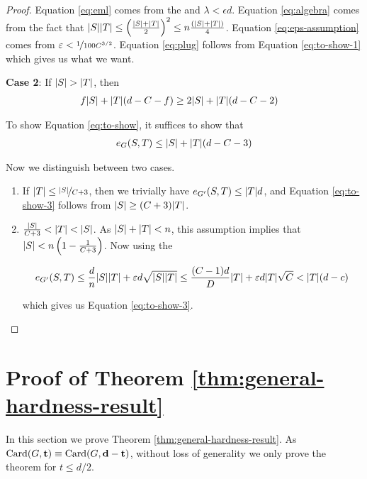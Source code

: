 \documentclass[11pt]{article}
\begin{document}
\begin{proof}
Equation \eqref{eq:eml} comes from the  and $\lambda < \epsilon d$.
Equation \eqref{eq:algebra} comes from the fact that $\Size{S}\Size{T} \leq \left(\frac{\Size{S}+\Size{T}}{2}\right)^2 \le n\frac{(\Size{S}+\Size{T})}{4}$.
Equation \eqref{eq:eps-assumption} comes from $\epsilon < \nicefrac{1}{100C^{3/2}}$.
Equation \eqref{eq:plug} follows from Equation \eqref{eq:to-show-1} which gives us what we want.

\textbf{Case 2}: If $\Size{S} > \Size{T}$, then 
  \begin{align}
    f\Size{S} +  \Size{T}(d-C-f)  &\ge 2\Size{S} +\Size{T}(d-C-2) \label{eq:to-show-2}
  \end{align}
  
  To show Equation \eqref{eq:to-show}, it suffices to show that
\begin{align}
  \CutEdges{S}{T}{G} \leq \Size{S} + \Size{T}(d-C-3) \label{eq:to-show-3}
\end{align}

Now we distinguish between two cases.

\begin{enumerate}

\item{
    If $\Size{T} \le \nicefrac{\Size{S}}{C+3}$, then we trivially have $\CutEdges{S}{T}{G'} \leq \Size{T}d$, and Equation \eqref{eq:to-show-3} follows from $\Size{S} \geq (C+3)\Size{T}$.
  }

\item{
$ \frac{\Size{S}}{C+3} < \Size{T} < \Size{S}$. As $\Size{S} + \Size{T} < n$, this assumption implies that $\Size{S} < n\left(1 - \frac{1}{C+3}\right)$.
Now using the 

\[ \CutEdges{S}{T}{G'} \le \frac{d}{n}\Size{S}\Size{T} + \epsilon d \sqrt{\Size{S}\Size{T}} \le \frac{(C-1)d}{D}\Size{T} + \epsilon d \Size{T}\sqrt{C} < \Size{T}(d-c)\]

which gives us Equation \eqref{eq:to-show-3}.
  }
  
\end{enumerate}
\end{proof}  



\section{Proof of Theorem \ref{thm:general-hardness-result}}
\label{sec:main-proof}

In this section we prove Theorem \ref{thm:general-hardness-result}. As $\Card{G, \vec{t}} \equiv \Card{G, \vec{d-t}}$, without loss of generality we only prove the theorem for $t \le d/2$. 
\end{document}

